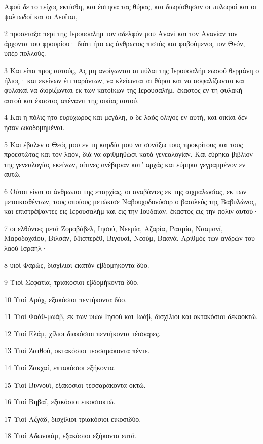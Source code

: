 \par Αφού δε το τείχος εκτίσθη, και έστησα τας θύρας, και διωρίσθησαν οι πυλωροί και οι ψαλτωδοί και οι Λευΐται,
\par 2 προσέταξα περί της Ιερουσαλήμ τον αδελφόν μου Ανανί και τον Ανανίαν τον άρχοντα του φρουρίου· διότι ήτο ως άνθρωπος πιστός και φοβούμενος τον Θεόν, υπέρ πολλούς.
\par 3 Και είπα προς αυτούς, Ας μη ανοίγωνται αι πύλαι της Ιερουσαλήμ εωσού θερμάνη ο ήλιος· και εκείνων έτι παρόντων, να κλείωνται αι θύραι και να ασφαλίζωνται και φυλακαί να διορίζωνται εκ των κατοίκων της Ιερουσαλήμ, έκαστος εν τη φυλακή αυτού και έκαστος απέναντι της οικίας αυτού.
\par 4 Και η πόλις ήτο ευρύχωρος και μεγάλη, ο δε λαός ολίγος εν αυτή, και οικίαι δεν ήσαν ωκοδομημέναι.
\par 5 Και έβαλεν ο Θεός μου εν τη καρδία μου να συνάξω τους προκρίτους και τους προεστώτας και τον λαόν, διά να αριθμηθώσι κατά γενεαλογίαν. Και εύρηκα βιβλίον της γενεαλογίας εκείνων, οίτινες ανέβησαν κατ' αρχάς και εύρηκα γεγραμμένον εν αυτώ.
\par 6 Ούτοι είναι οι άνθρωποι της επαρχίας, οι αναβάντες εκ της αιχμαλωσίας, εκ των μετοικισθέντων, τους οποίους μετώκισε Ναβουχοδονόσορ ο βασιλεύς της Βαβυλώνος, και επιστρέψαντες εις Ιερουσαλήμ και εις την Ιουδαίαν, έκαστος εις την πόλιν αυτού·
\par 7 οι ελθόντες μετά Ζοροβάβελ, Ιησού, Νεεμία, Αζαρία, Ρααμία, Νααμανί, Μαροδοχαίου, Βιλσάν, Μισπερέθ, Βιγουαί, Νεούμ, Βαανά. Αριθμός των ανδρών του λαού Ισραήλ·
\par 8 υιοί Φαρώς, δισχίλιοι εκατόν εβδομήκοντα δύο.
\par 9 Υιοί Σεφατία, τριακόσιοι εβδομήκοντα δύο.
\par 10 Υιοί Αράχ, εξακόσιοι πεντήκοντα δύο.
\par 11 Υιοί Φαάθ-μωάβ, εκ των υιών Ιησού και Ιωάβ, δισχίλιοι και οκτακόσιοι δεκαοκτώ.
\par 12 Υιοί Ελάμ, χίλιοι διακόσιοι πεντήκοντα τέσσαρες.
\par 13 Υιοί Ζατθού, οκτακόσιοι τεσσαράκοντα πέντε.
\par 14 Υιοί Ζακχαί, επτακόσιοι εξήκοντα.
\par 15 Υιοί Βιννουΐ, εξακόσιοι τεσσαράκοντα οκτώ.
\par 16 Υιοί Βηβαΐ, εξακόσιοι εικοσιοκτώ.
\par 17 Υιοί Αζγάδ, δισχίλιοι τριακόσιοι εικοσιδύο.
\par 18 Υιοί Αδωνικάμ, εξακόσιοι εξήκοντα επτά.
